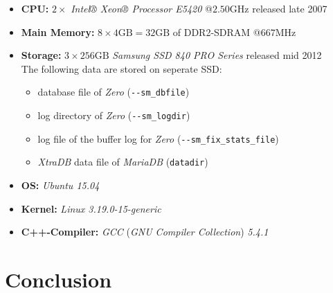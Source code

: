 \begin{@empty}
	\begin{itemize}
		\itemsep0em
		\item	\textbf{CPU:} $2 \times $ \emph{Intel® Xeon® Processor E5420} @$2.50\text{GHz}$ released late 2007
		\item	\textbf{Main Memory:} $8 \times 4\text{GB} = 32\text{GB}$ of DDR2-SDRAM @$667\text{MHz}$
		\item	\textbf{Storage:} $3 \times 256\text{GB}$ \emph{Samsung SSD 840 PRO Series} released mid 2012 \\
			The following data are stored on seperate SSD:
			\begin{itemize}
				\item	database file of \emph{Zero} (\lstinline{--sm_dbfile})
				\item	log directory of \emph{Zero} (\lstinline{--sm_logdir})
				\item	log file of the buffer log for \emph{Zero} (\lstinline{--sm_fix_stats_file})
				\item	\emph{XtraDB} data file of \emph{MariaDB} (\lstinline{datadir})
			\end{itemize}
		\item	\textbf{OS:} \emph{Ubuntu 15.04}
		\item	\textbf{Kernel:} \emph{Linux 3.19.0-15-generic}
		\item	\textbf{C++-Compiler:} \emph{GCC} (\emph{GNU Compiler Collection}) \emph{5.4.1}
	\end{itemize}
\end{@empty}

\section{Conclusion}
